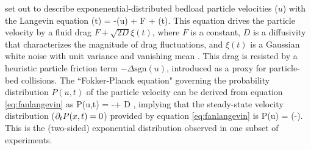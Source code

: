 \citet{Fan2014} set out to describe exponenential-distributed bedload particle velocities ($u$) with the Langevin equation
\be {}(t) = -\Delta {}(u) + F + \xi(t). \label{eq:fanlangevin}\ee
This equation drives the particle velocity by a fluid drag $F + \sqrt{2D} \xi(t)$, where $F$ is a constant, $D$ is a diffusivity that characterizes the magnitude of drag fluctuations, and $\xi(t)$ is a Gaussian white noise with unit variance and vanishing mean \citep{Gardiner1983}.
This drag is resisted by a heuristic particle friction term $-\Delta \text{sgn}(u)$, introduced as a proxy for particle-bed collisions.
The ``Fokker-Planck equation" governing the probability distribution $P(u,t)$ of the particle velocity can be derived from equation \ref{eq:fanlangevin} as \citep{Risken1989,VanKampen2007} 
\be {} P(u,t) = -\Delta{} + D ,\ee
implying that the steady-state velocity distribution ($\partial_t P(x,t) = 0$) provided by equation \ref{eq:fanlangevin} is
\be P(u) = \exp\Big(-\Big).\ee
This is the (two-sided) exponential distribution observed in one subset of experiments.

